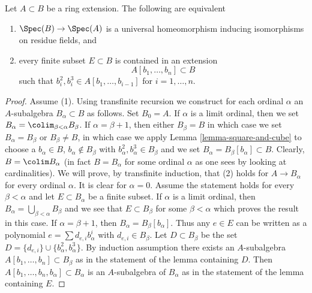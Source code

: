 \begin{proposition}
\label{proposition-universal-homeomorphism-equal-residue-fields}
Let $A \subset B$ be a ring extension. The following are equivalent
\begin{enumerate}
\item $\Spec(B) \to \Spec(A)$ is a universal homeomorphism inducing
isomorphisms on residue fields, and
\item every finite subset $E \subset B$ is contained in an extension
$$
A[b_1, \ldots, b_n] \subset B
$$
such that $b_i^2, b_i^3 \in A[b_1, \ldots, b_{i - 1}]$ for $i = 1, \ldots, n$.
\end{enumerate}
\end{proposition}

\begin{proof}
Assume (1). Using transfinite recursion we construct for each ordinal $\alpha$
an $A$-subalgebra $B_\alpha \subset B$ as follows. Set $B_0 = A$. If $\alpha$
is a limit ordinal, then we set $B_\alpha = \colim_{\beta < \alpha} B_\beta$.
If $\alpha = \beta + 1$, then either
$B_\beta = B$ in which case we set $B_\alpha = B_\beta$ or
$B_\beta \not = B$, in which case we apply Lemma \ref{lemma-square-and-cube}
to choose a $b_\alpha \in B$, $b_\alpha \not \in B_\beta$ with
$b_\alpha^2, b_\alpha^3 \in B_\beta$
and we set $B_\alpha = B_\beta[b_\alpha] \subset B$.
Clearly, $B = \colim B_\alpha$ (in fact $B = B_\alpha$ for some
ordinal $\alpha$ as one sees by looking at cardinalities).
We will prove, by transfinite induction, that (2) holds for
$A \to B_\alpha$ for every ordinal $\alpha$. It is clear for
$\alpha = 0$. Assume the statement holds for every $\beta < \alpha$
and let $E \subset B_\alpha$ be a finite subset.
If $\alpha$ is a limit ordinal, then
$B_\alpha = \bigcup_{\beta < \alpha} B_\beta$ and we see
that $E \subset B_\beta$ for some $\beta < \alpha$ which
proves the result in this case. If $\alpha = \beta + 1$,
then $B_\alpha = B_\beta[b_\alpha]$. Thus any $e \in E$
can be written as a polynomial $e = \sum d_{e, i}b_\alpha^i$
with $d_{e, i} \in B_\beta$. Let $D \subset B_\beta$
be the set $D = \{d_{e, i}\} \cup \{b_\alpha^2, b_\alpha^3\}$.
By induction assumption
there exists an $A$-subalgebra $A[b_1, \ldots, b_n] \subset B_\beta$
as in the statement of the lemma containing $D$.
Then $A[b_1, \ldots, b_n, b_\alpha] \subset B_\alpha$
is an $A$-subalgebra of $B_\alpha$ as in the statement
of the lemma containing $E$.


\end{proof}
